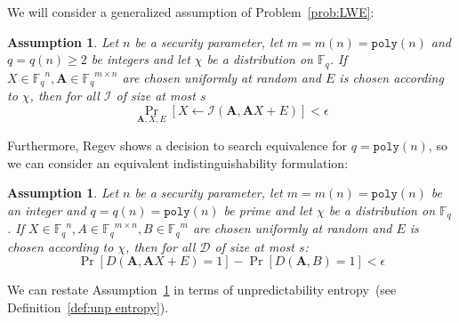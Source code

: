 \documentclass[11pt]{article}
\newcommand{\probref}[1]{\mbox{Problem~\ref{#1}}}
\newcommand{\vect}[1]{\ensuremath{\textbf{#1}}}
\newcommand{\Fq}{\ensuremath{\mathbb{F}_q}}
\newcommand{\poly}{\ensuremath{\mathtt{poly}}\xspace}
\newtheorem{assumption}[theorem]{Assumption}
\newcommand{\vA}{\vect{A}}
\begin{document}
{We will consider a generalized assumption of \probref{prob:LWE}:
\begin{assumption}
\label{assume:general LWE}
Let $n$ be a security parameter, let $m = m(n) = \poly(n)$ and $q=q(n)\geq 2$ be integers and let $\chi$ be a distribution on $\Fq$.  If $X\in\Fq^n, \vA\in\Fq^{m\times n}$ are chosen uniformly at random and $E$ is chosen according to $\chi$, then for all $\mathcal{I}$ of size at most $s$
\[
\Pr_{\vA, X, E}[X\leftarrow \mathcal{I}(\vA, \vA X+E)]<\epsilon
\]
\end{assumption}
Furthermore, Regev shows a decision to search equivalence for $q=\poly(n)$, so we can consider an equivalent indistinguishability formulation:
\begin{assumption}
\label{assume:indist LWE}
Let $n$ be a security parameter, let $m = m(n) = \poly(n)$ be an integer and $q = q(n) = \poly(n)$ be prime and let $\chi$ be a distribution on $\Fq$.  If $X\in\Fq^n, A\in\Fq^{m\times n}, B\in\Fq^m$ are chosen uniformly at random and $E$ is chosen according to $\chi$, then for all $\mathcal{D}$ of size at most $s$:
\[
\Pr[D(\vA, \vA X+E)=1]-\Pr[D(\vA, B)=1]<\epsilon
\]
\end{assumption}
We can restate Assumption~\ref{assume:indist LWE} in terms of unpredictability entropy~(see Definition~\ref{def:unp entropy}).  
}
\end{document}
